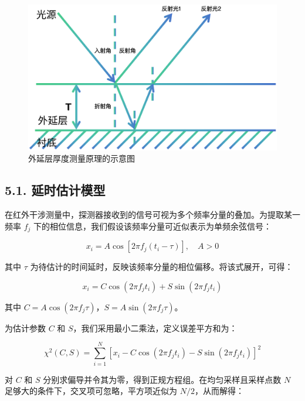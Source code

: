 \documentclass[withoutpreface,bwprint]{cumcmthesis}
\begin{document}
\begin{figure}[H]
    \centering
    \includegraphics[width=1\linewidth]{figures/问题1原理图.eps}
    \caption{外延层厚度测量原理的示意图}
    \label{fig:placeholder2}
\end{figure}

\subsection*{5.1. 延时估计模型}

在红外干涉测量中，探测器接收到的信号可视为多个频率分量的叠加。为提取某一频率 $f_j$ 下的相位信息，我们假设该频率分量可近似表示为单频余弦信号：

\begin{equation}
    x_i = A \cos[2\pi f_j(t_i - \tau)], \quad A > 0
\end{equation}

其中 $\tau$ 为待估计的时间延时，反映该频率分量的相位偏移。将该式展开，可得：

\begin{equation}
    x_i = C \cos(2\pi f_j t_i) + S \sin(2\pi f_j t_i)
\end{equation}

其中 $C = A \cos(2\pi f_j \tau)$，$S = A \sin(2\pi f_j \tau)$。

为估计参数 $C$ 和 $S$，我们采用最小二乘法，定义误差平方和为：

\begin{equation}
    \chi^2(C, S) = \sum_{i=1}^{N} \left[x_i - C \cos(2\pi f_j t_i) - S \sin(2\pi f_j t_i)\right]^2
\end{equation}

对 $C$ 和 $S$ 分别求偏导并令其为零，得到正规方程组。在均匀采样且采样点数 $N$ 足够大的条件下，交叉项可忽略，平方项近似为 $N/2$，从而解得：
\end{document}
